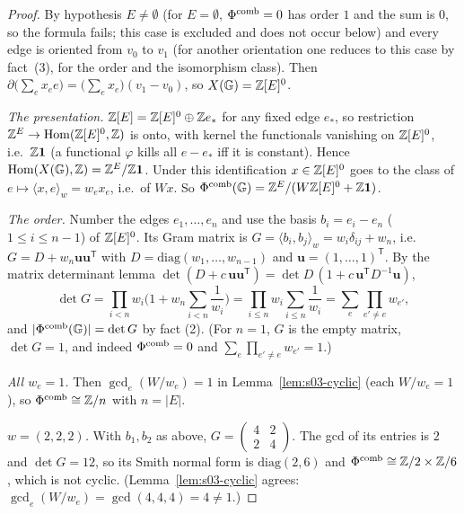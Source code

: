 \begin{proof}
By hypothesis $E\ne\emptyset$ (for $E=\emptyset$, $\Phi^{\mathrm{comb}}=0$ has order $1$ and the sum is $0$, so the formula fails; this case is excluded and does not
occur below) and every edge is oriented from $v_0$ to $v_1$ (for another orientation one reduces to this case by fact~(3), for the order and the
isomorphism class). Then $\partial\big(\sum_ex_ee\big)=\big(\sum_ex_e\big)(v_1-v_0)$,
so $X(\mathbb{G})=\mathbb{Z}[E]^0$.

\emph{The presentation.} $\mathbb{Z}[E]=\mathbb{Z}[E]^0\oplus\mathbb{Z} e_*$ for any fixed edge $e_*$, so restriction $\mathbb{Z}^E\to\operatorname{Hom}(\mathbb{Z}[E]^0,\mathbb{Z})$ is onto, with kernel
the functionals vanishing on $\mathbb{Z}[E]^0$, i.e.\ $\mathbb{Z}\mathbf 1$ (a functional $\varphi$ kills all $e-e_*$ iff it is constant). Hence
$\operatorname{Hom}(X(\mathbb{G}),\mathbb{Z})=\mathbb{Z}^E/\mathbb{Z}\mathbf 1$. Under this identification $x\in\mathbb{Z}[E]^0$ goes to the class of $e\mapsto\langle x,e\rangle_w=w_ex_e$, i.e.\ of
$Wx$. So $\Phi^{\mathrm{comb}}(\mathbb{G})=\mathbb{Z}^E/(W\mathbb{Z}[E]^0+\mathbb{Z}\mathbf 1)$.

\emph{The order.} Number the edges $e_1,\dots,e_n$ and use the basis $b_i=e_i-e_n$ ($1\le i\le n-1$) of $\mathbb{Z}[E]^0$. Its Gram matrix is
$G=\langle b_i,b_j\rangle_w=w_i\delta_{ij}+w_n$, i.e.\ $G=D+w_n\mathbf u\mathbf u^{\mathsf T}$ with $D=\mathrm{diag}(w_1,\dots,w_{n-1})$ and
$\mathbf u=(1,\dots,1)^{\mathsf T}$. By the matrix determinant lemma $\det(D+c\,\mathbf u\mathbf u^{\mathsf T})=\det D\,(1+c\,\mathbf u^{\mathsf T}D^{-1}\mathbf u)$,
\[\det G=\prod_{i<n}w_i\Big(1+w_n\sum_{i<n}\frac1{w_i}\Big)=\prod_{i\le n}w_i\sum_{i\le n}\frac1{w_i}=\sum_e\prod_{e'\ne e}w_{e'},\]
and $|\Phi^{\mathrm{comb}}(\mathbb{G})|=\det G$ by fact (2). (For $n=1$, $G$ is the empty matrix, $\det G=1$, and indeed $\Phi^{\mathrm{comb}}=0$ and $\sum_e\prod_{e'\ne e}w_{e'}=1$.)

\emph{All $w_e=1$.} Then $\gcd_e(W/w_e)=1$ in Lemma~\ref{lem:s03-cyclic} (each $W/w_e=1$), so $\Phi^{\mathrm{comb}}\cong\mathbb{Z}/n$ with $n=|E|$.

\emph{$w=(2,2,2)$.} With $b_1,b_2$ as above, $G=\left(\begin{smallmatrix}4&2\\2&4\end{smallmatrix}\right)$. The gcd of its entries is $2$ and
$\det G=12$, so its Smith normal form is $\mathrm{diag}(2,6)$ and $\Phi^{\mathrm{comb}}\cong\mathbb{Z}/2\times\mathbb{Z}/6$, which is not cyclic. (Lemma~\ref{lem:s03-cyclic}
agrees: $\gcd_e(W/w_e)=\gcd(4,4,4)=4\ne1$.)
\end{proof}

